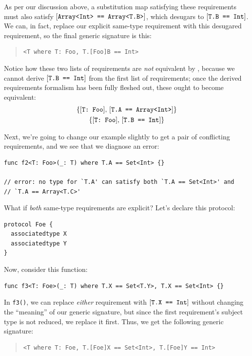 \documentclass[../generics]{subfiles}
\begin{document}
As per our discussion above, a substitution map satisfying these requirements must also satisfy $[\texttt{Array<Int> == Array<T.B>}]$, which desugars to $[\texttt{T.B == Int}]$. We can, in fact, replace our explicit same-type requirement with this desugared requirement, so the final generic signature is this:
\begin{quote}
\begin{verbatim}
<T where T: Foo, T.[Foo]B == Int>
\end{verbatim}
\end{quote}
Notice how these two lists of requirements are \emph{not} equivalent by , because we cannot derive $[\texttt{T.B == Int}]$ from the first list of requirements; once the derived requirements formalism has been fully fleshed out, these ought to become equivalent:
\begin{gather*}
\{ [\texttt{T:~Foo}],\, [\texttt{T.A == Array<Int>}] \}\\
\{ [\texttt{T:~Foo}],\, [\texttt{T.B == Int}] \}
\end{gather*}

Next, we're going to change our example slightly to get a pair of conflicting requirements, and we see that we diagnose an error:
\begin{Verbatim}
func f2<T: Foo>(_: T) where T.A == Set<Int> {}

// error: no type for `T.A' can satisfy both `T.A == Set<Int>' and
// `T.A == Array<T.C>'
\end{Verbatim}

What if \emph{both} same-type requirements are explicit? Let's declare this protocol:
\begin{Verbatim}
protocol Foe {
  associatedtype X
  associatedtype Y
}
\end{Verbatim}
Now, consider this function:
\begin{Verbatim}
func f3<T: Foe>(_: T) where T.X == Set<T.Y>, T.X == Set<Int> {}
\end{Verbatim}
In \texttt{f3()}, we can replace \emph{either} requirement with $[\texttt{T.X == Int}]$ without changing the ``meaning'' of our generic signature, but since the first requirement's subject type is not reduced, we replace it first. Thus, we get the following generic signature:
\begin{quote}
\begin{verbatim}
<T where T: Foe, T.[Foe]X == Set<Int>, T.[Foe]Y == Int>
\end{verbatim}
\end{quote}
\end{document}
